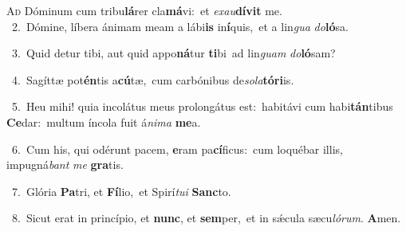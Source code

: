 \lettrine{\initial\textcolor{\initialcolor}{A}}{d} Dóminum cum tribu\-\textbf{lá}\-rer cla\-\textbf{má}\-vi:~\star et \textit{ex}\-\textit{au}\textbf{dí}\textbf{vit} me.\\
{\numbfont\textcolor{\numbcolor}{~2.}}~Dómine, líbera ánimam meam a lábi\textbf{is} in\-\textbf{í}\-quis,~\star et a lin\textit{gua} \textit{do}\-\textbf{ló}sa.\par
{\numbfont\textcolor{\numbcolor}{~3.}}~Quid detur tibi, aut quid appo\-\textbf{ná}\-tur \textbf{ti}\-bi~\star ad lin\textit{guam} \textit{do}\-\textbf{ló}sam?\par
{\numbfont\textcolor{\numbcolor}{~4.}}~Sagíttæ pot\-\textbf{én}\-tis a\-\textbf{cú}\-tæ,~\star cum carbónibus de\-\textit{so}\-\textit{la}\textbf{tó}\textbf{ri}is.\par
{\numbfont\textcolor{\numbcolor}{~5.}}~Heu mihi! quia incolátus meus prolongátus est:~\dagger habitávi cum habi\-\textbf{tán}\-tibus \textbf{Ce}\-dar:~\star multum íncola fuit á\-\textit{ni}\-\textit{ma} \textbf{me}\-a.\par
{\numbfont\textcolor{\numbcolor}{~6.}}~Cum his, qui odérunt pacem, \textbf{e}\-ram pa\-\textbf{cí}\-ficus:~\star cum loquébar illis, impugná\textit{bant} \textit{me} \textbf{gra}\-tis.\par
{\numbfont\textcolor{\numbcolor}{~7.}}~Glória \textbf{Pa}\-tri, et \textbf{Fí}\-lio,~\star et Spirí\-\textit{tu}\-\textit{i} \textbf{Sanc}\-to.\par
{\numbfont\textcolor{\numbcolor}{~8.}}~Sicut erat in princípio, et \textbf{nunc}\-, et \textbf{sem}\-per,~\star et in sǽcula sæcu\-\textit{ló}\-\textit{rum}. \textbf{A}\-men.\par
